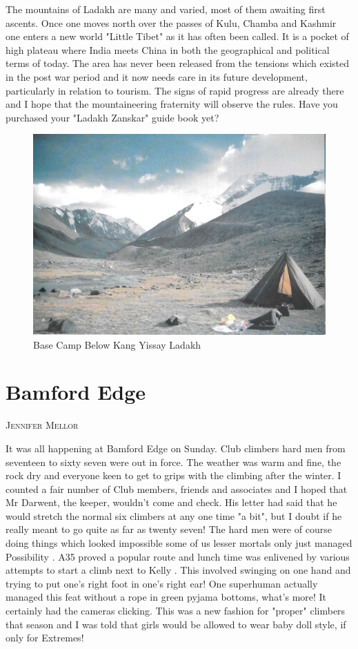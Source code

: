 \documentclass[a5paper,openany,font 10pt]{scrbook}
\makeatletter
\newcommand{\chapterauthor}[1]{%
{\parindent0pt\vspace*{-5pt}%
\linespread{1.1}\large\scshape#1%
\par\nobreak\vspace*{35pt}}
\@afterheading%
}
\makeatother
\begin{document}
The mountains of Ladakh are many and varied, most of them
awaiting first ascents. Once one moves north over the passes of
Kulu, Chamba and Kashmir one enters a new world   "Little Tibet"
as it has often been called. It is a pocket of high plateau where
India meets China in both the geographical and political terms of
today. The area has never been released from the tensions which
existed in the post war period and it now needs care in its
future development, particularly in relation to tourism. The
signs of rapid progress are already there and I hope that the
mountaineering fraternity will observe the rules.
Have you purchased your "Ladakh Zanskar" guide book yet?
\begin{figure}[htb]
\centering
\includegraphics[width=.9\linewidth]{./images/Base_camp_below_Kang_Yissay_Ladakh.jpg}
\caption{\label{fig:orgcb02ee5}
Base Camp Below Kang Yissay Ladakh}
\end{figure}

\chapter{Bamford Edge}
\label{sec:org975cde5}
\chapterauthor{Jennifer Mellor}

It was all happening at Bamford Edge on Sunday. Club climbers hard men
from seventeen to sixty seven were out in force. The weather was warm
and fine, the rock dry and everyone keen to get to grips with the
climbing after the winter. I counted a fair number of Club members,
friends and associates and I hoped that Mr Darwent, the keeper,
wouldn't come and check. His letter had said that he would stretch the
normal six climbers at any one time "a bit", but I doubt if he really
meant to go quite as far as twenty seven! The hard men were of course
doing things which looked impossible some of us lesser mortals only
just managed Possibility .  A35 proved a popular route and lunch time
was enlivened by various attempts to start a climb next to Kelly .
This involved swinging on one hand and trying to put one's right foot
in one's right ear! One superhuman actually managed this feat without
a rope in green pyjama bottoms, what's more! It certainly had the
cameras clicking. This was a new fashion for "proper" climbers that
season and I was told that girls would be allowed to wear baby doll
style, if only for Extremes!
\end{document}
